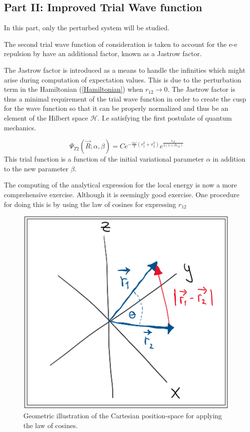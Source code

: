 \documentclass[aip,nobalancelastpage,
twocolumn,
rsi,%
 amsmath,amssymb,
 reprint,%
]{revtex4}
\begin{document}
\subsection{Part II: Improved Trial Wave function}
In this part, only the perturbed system will be studied.\par
The second trial wave function of consideration is taken to account for the e-e repulsion by have an additional factor, known as a Jastrow factor. \par
The Jastrow factor is introduced as a means to handle the infinities which might arise during computation of expectation values. This is due to the perturbation term in the Hamiltonian (\ref{Hamiltonian}) when $r_{12}\to 0$. The Jastrow factor is thus a minimal requirement of the trial wave function in order to create the cusp for the wave function so that it can be properly normalized and thus be an element of the Hilbert space $\mathcal{H}$. I.e satisfying the first postulate of quantum mechanics\cite{LectureNotes}.

\large
\begin{equation}
\label{Trialfunction2}
\Psi_{T2}(\vec{R};\alpha,\beta) = C e^{-\frac{\alpha \omega}{2}\left(r_1^2 + r_2^2\right)}e^{\frac{r_{12}}{2\left(1+\beta r_{12}\right)}}
\end{equation}
\normalsize
This trial function is a function of the initial variational parameter $\alpha$ in addition to the new parameter $\beta$.\par
The computing of the analytical expression for the local energy is now a more comprehensive exercise. Although it is seemingly good exercise. One procedure for doing this is by using the law of cosines for expressing $r_{12}$

\begin{figure}[H]
\center
\includegraphics[scale=0.45]{axis.png}
\caption{Geometric illustration of the Cartesian position-space for applying the law of cosines. }
\end{figure}
\end{document}
